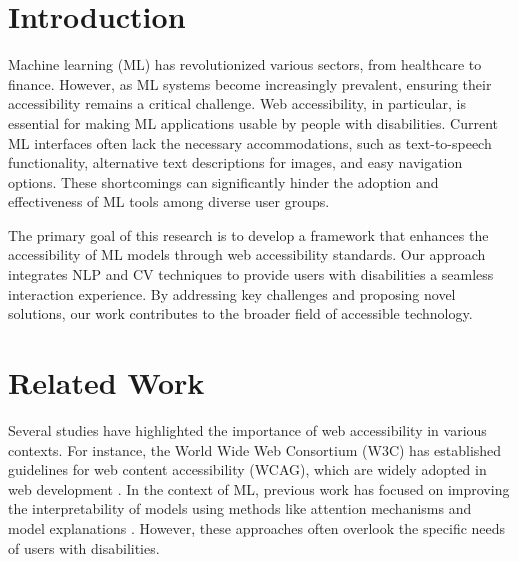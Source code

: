 \begin{abstract}
This paper investigates the current state of web accessibility in machine learning (ML) models and proposes an innovative approach to enhance the accessibility of ML applications. We explore existing challenges in implementing accessible ML interfaces and present a comprehensive framework designed to address these issues. The proposed framework leverages recent advancements in natural language processing (NLP) and computer vision (CV) to improve the interpretability and usability of ML models. Through empirical evaluation, we demonstrate significant improvements in user experience and accessibility metrics. This work aims to bridge the gap between cutting-edge ML technologies and real-world usability requirements, thereby fostering more inclusive and user-friendly applications.
\end{abstract}

\section{Introduction}
Machine learning (ML) has revolutionized various sectors, from healthcare to finance. However, as ML systems become increasingly prevalent, ensuring their accessibility remains a critical challenge. Web accessibility, in particular, is essential for making ML applications usable by people with disabilities. Current ML interfaces often lack the necessary accommodations, such as text-to-speech functionality, alternative text descriptions for images, and easy navigation options. These shortcomings can significantly hinder the adoption and effectiveness of ML tools among diverse user groups.

The primary goal of this research is to develop a framework that enhances the accessibility of ML models through web accessibility standards. Our approach integrates NLP and CV techniques to provide users with disabilities a seamless interaction experience. By addressing key challenges and proposing novel solutions, our work contributes to the broader field of accessible technology.

\section{Related Work}
Several studies have highlighted the importance of web accessibility in various contexts. For instance, the World Wide Web Consortium (W3C) has established guidelines for web content accessibility (WCAG), which are widely adopted in web development \cite{w3c_wca}. In the context of ML, previous work has focused on improving the interpretability of models using methods like attention mechanisms \cite{kim2018attention} and model explanations \cite{klein2019model}. However, these approaches often overlook the specific needs of users with disabilities.

